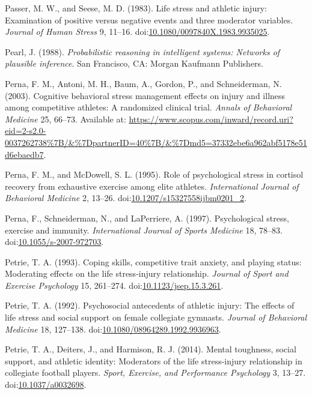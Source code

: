 \documentclass[
  english,
  man,floatsintext]{apa6}
\newlength{\cslhangindent}
\newenvironment{cslreferences}%
  {\setlength{\parindent}{0pt}%
  \everypar{\setlength{\hangindent}{\cslhangindent}}\ignorespaces}%
  {\par}
\begin{document}
\begin{cslreferences}
\leavevmode\hypertarget{ref-Passer1983a}{}%
Passer, M. W., and Seese, M. D. (1983). Life stress and athletic injury: Examination of positive versus negative events and three moderator variables. \emph{Journal of Human Stress} 9, 11--16. doi:\href{https://doi.org/10.1080/0097840X.1983.9935025}{10.1080/0097840X.1983.9935025}.

\leavevmode\hypertarget{ref-Pearl1988}{}%
Pearl, J. (1988). \emph{Probabilistic reasoning in intelligent systems: Networks of plausible inference}. San Francisco, CA: Morgan Kaufmann Publishers.

\leavevmode\hypertarget{ref-Perna2003}{}%
Perna, F. M., Antoni, M. H., Baum, A., Gordon, P., and Schneiderman, N. (2003). Cognitive behavioral stress management effects on injury and illness among competitive athletes: A randomized clinical trial. \emph{Annals of Behavioral Medicine} 25, 66--73. Available at: \url{https://www.scopus.com/inward/record.uri?eid=2-s2.0-0037262738\%7B/\&\%7DpartnerID=40\%7B/\&\%7Dmd5=37332ebe6a962abf5178e51d6ebaedb7}.

\leavevmode\hypertarget{ref-Perna1995}{}%
Perna, F. M., and McDowell, S. L. (1995). Role of psychological stress in cortisol recovery from exhaustive exercise among elite athletes. \emph{International Journal of Behavioral Medicine} 2, 13--26. doi:\href{https://doi.org/10.1207/s15327558ijbm0201_2}{10.1207/s15327558ijbm0201\_2}.

\leavevmode\hypertarget{ref-Perna1997}{}%
Perna, F., Schneiderman, N., and LaPerriere, A. (1997). Psychological stress, exercise and immunity. \emph{International Journal of Sports Medicine} 18, 78--83. doi:\href{https://doi.org/10.1055/s-2007-972703}{10.1055/s-2007-972703}.

\leavevmode\hypertarget{ref-Petrie1993}{}%
Petrie, T. A. (1993). Coping skills, competitive trait anxiety, and playing status: Moderating effects on the life stress-injury relationship. \emph{Journal of Sport and Exercise Psychology} 15, 261--274. doi:\href{https://doi.org/10.1123/jsep.15.3.261}{10.1123/jsep.15.3.261}.

\leavevmode\hypertarget{ref-Petrie1992}{}%
Petrie, T. A. (1992). Psychosocial antecedents of athletic injury: The effects of life stress and social support on female collegiate gymnasts. \emph{Journal of Behavioral Medicine} 18, 127--138. doi:\href{https://doi.org/10.1080/08964289.1992.9936963}{10.1080/08964289.1992.9936963}.

\leavevmode\hypertarget{ref-Petrie2014}{}%
Petrie, T. A., Deiters, J., and Harmison, R. J. (2014). Mental toughness, social support, and athletic identity: Moderators of the life stress-injury relationship in collegiate football players. \emph{Sport, Exercise, and Performance Psychology} 3, 13--27. doi:\href{https://doi.org/10.1037/a0032698}{10.1037/a0032698}.


\end{cslreferences}
\end{document}
